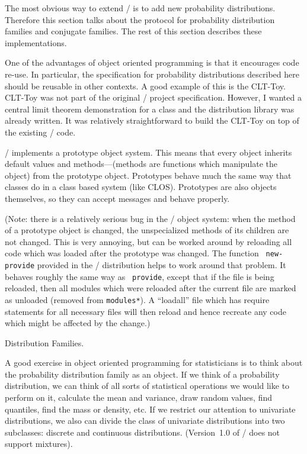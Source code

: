 The most obvious way to extend \eltoy/ is to add new probability
distributions.  Therefore this section talks about the protocol for
probability distribution families and conjugate families.  The rest of
this section describes these implementations.  

One of the advantages of object oriented programming is that it encourages
code re-use.  In particular, the specification for probability
distributions described here should be reusable in other contexts.  A
good example of this is the CLT-Toy.  CLT-Toy was not part of the
original \eltoy/ project specification.  However, I wanted a central
limit theorem demonstration for a class and the distribution library
was already written.  It was relatively straightforward to build the
CLT-Toy on top of the existing \disttoy/ code.  

\xlispstat/ implements a prototype object system.  This means that
every object inherits default values and methods---(methods are
functions which manipulate the object) from the prototype object.
Prototypes behave much the same way that classes do in a class based
system (like CLOS).  Prototypes are also objects themselves, so they
can accept messages and behave properly.  

(Note: there is a relatively serious bug in the \xlispstat/ object
system: when the method of a prototype object is changed, the
unspecialized methods of its children are not changed.  This is very
annoying, but can be worked around by reloading all code which was
loaded after the prototype was changed.  The function {\tt
new-provide\/} provided in the \eltoy/ distribution helps to work
around that problem.  It behaves roughly the same way as {\tt
provide\/}, except that if the file is being reloaded, then all
modules which were reloaded after the current file are marked as unloaded
(removed from {\tt *modules*\/}).  A ``loadall'' file which has
require statements for all necessary files will then reload and hence
recreate any code which might be affected by the change.)


 Distribution Families.

A good exercise in object oriented programming for statisticians is to
think about the probability distribution family as an object.  If we
think of a probability distribution, we can think of all sorts of
statistical operations we would like to perform on it, calculate the
mean and variance, draw random values, find quantiles, find the mass
or density, etc.  If we restrict our attention to univariate
distributions, we also can divide the class of univariate
distributions into two subclasses:  discrete and continuous
distributions.  (Version~1.0 of \eltoy/ does not support mixtures).

